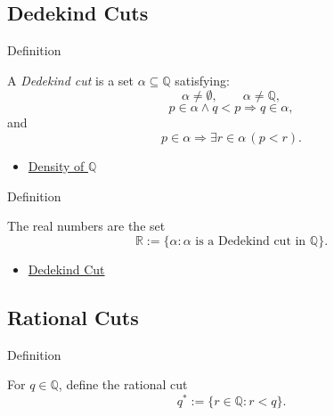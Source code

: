 \subsection*{Dedekind Cuts}

\begin{definitionbox}{Definition}
\begin{definition}
\label{def:dedekind-cut}
A \emph{Dedekind cut} is a set $\alpha\subseteq\mathbb{Q}$ satisfying:
\[
\alpha\ne\emptyset,\qquad \alpha\ne\mathbb{Q},
\]
\[
p\in\alpha\land q<p \Longrightarrow q\in\alpha,
\]
and
\[
p\in\alpha \Longrightarrow \exists r\in\alpha\,(p<r).
\]
\end{definition}
\end{definitionbox}

\begin{dependencies}
\begin{itemize}
  \item \hyperref[thm:density-of-q]{Density of $\mathbb{Q}$}
\end{itemize}
\end{dependencies}

\begin{definitionbox}{Definition}
\begin{definition}
\label{def:reals}
The real numbers are the set
\[
\mathbb{R}:=\{\alpha:\alpha\text{ is a Dedekind cut in }\mathbb{Q}\}.
\]
\end{definition}
\end{definitionbox}

\begin{dependencies}
\begin{itemize}
  \item \hyperref[def:dedekind-cut]{Dedekind Cut}
\end{itemize}
\end{dependencies}

\subsection*{Rational Cuts}

\begin{definitionbox}{Definition}
\begin{definition}
\label{def:rational-cut}
For $q\in\mathbb{Q}$, define the rational cut
\[
q^{\ast}:=\{r\in\mathbb{Q}:r<q\}.
\]
\end{definition}
\end{definitionbox}

